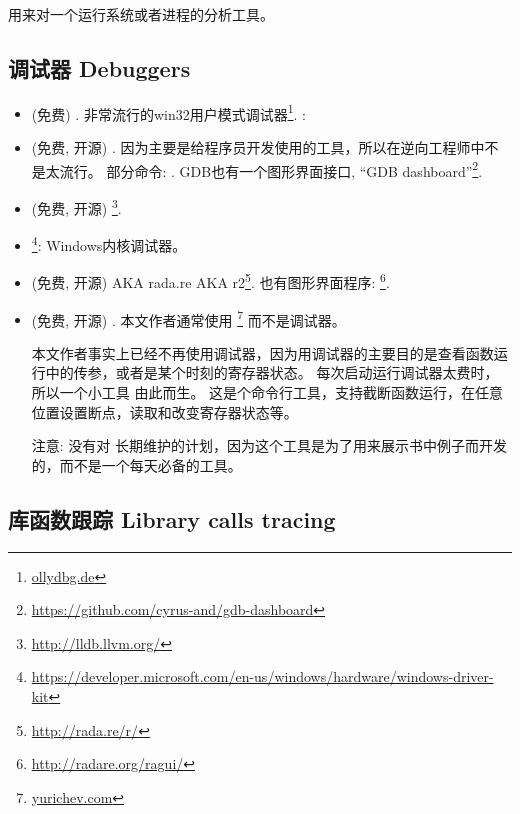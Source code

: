 \documentclass[UTF8,nofonts]{ctexart}
\begin{document}
用来对一个运行系统或者进程的分析工具。

\subsection{调试器 Debuggers}

\myindex{\olly}

\begin{itemize}
\item (免费) .
非常流行的win32用户模式调试器\footnote{\href{http://go.yurichev.com/17032}{ollydbg.de}}.
\ShortHotKeyCheatsheet: 

\item (免费, 开源) .
因为主要是给程序员开发使用的工具，所以在逆向工程师中不是太流行。
部分命令: .
GDB也有一个图形界面接口, ``GDB dashboard''\footnote{\url{https://github.com/cyrus-and/gdb-dashboard}}.

\item (免费, 开源) \footnote{\url{http://lldb.llvm.org/}}.

\item {}\footnote{\url{https://developer.microsoft.com/en-us/windows/hardware/windows-driver-kit}}:
Windows内核调试器。

\item (免费, 开源)  \ac{AKA} rada.re \ac{AKA} r2\footnote{\url{http://rada.re/r/}}.
也有图形界面程序: \footnote{\url{http://radare.org/ragui/}}.

\item (免费, 开源) .
\label{tracer}
本文作者通常使用 
\footnote{\href{http://go.yurichev.com/17338}{yurichev.com}}
而不是调试器。

本文作者事实上已经不再使用调试器，因为用调试器的主要目的是查看函数运行中的传参，或者是某个时刻的寄存器状态。
每次启动运行调试器太费时，所以一个小工具  由此而生。
这是个命令行工具，支持截断函数运行，在任意位置设置断点，读取和改变寄存器状态等。

注意: 没有对  长期维护的计划，因为这个工具是为了用来展示书中例子而开发的，而不是一个每天必备的工具。
\end{itemize}

\subsection{库函数跟踪 Library calls tracing}
\end{document}
